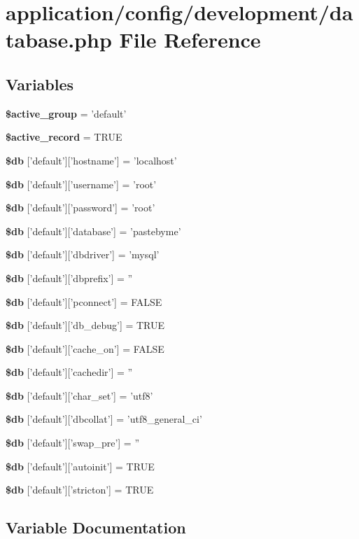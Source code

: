 \section{application/config/development/database.php File Reference}
\label{development_2database_8php}
\subsection*{Variables}
\begin{DoxyCompactItemize}
\item 
{\bf \$active\-\_\-group} = 'default'
\item 
{\bf \$active\-\_\-record} = T\-R\-U\-E
\item 
{\bf \$db} ['default']['hostname'] = 'localhost'
\item 
{\bf \$db} ['default']['username'] = 'root'
\item 
{\bf \$db} ['default']['password'] = 'root'
\item 
{\bf \$db} ['default']['database'] = 'pastebyme'
\item 
{\bf \$db} ['default']['dbdriver'] = 'mysql'
\item 
{\bf \$db} ['default']['dbprefix'] = ''
\item 
{\bf \$db} ['default']['pconnect'] = F\-A\-L\-S\-E
\item 
{\bf \$db} ['default']['db\-\_\-debug'] = T\-R\-U\-E
\item 
{\bf \$db} ['default']['cache\-\_\-on'] = F\-A\-L\-S\-E
\item 
{\bf \$db} ['default']['cachedir'] = ''
\item 
{\bf \$db} ['default']['char\-\_\-set'] = 'utf8'
\item 
{\bf \$db} ['default']['dbcollat'] = 'utf8\-\_\-general\-\_\-ci'
\item 
{\bf \$db} ['default']['swap\-\_\-pre'] = ''
\item 
{\bf \$db} ['default']['autoinit'] = T\-R\-U\-E
\item 
{\bf \$db} ['default']['stricton'] = T\-R\-U\-E
\end{DoxyCompactItemize}


\subsection{Variable Documentation}
